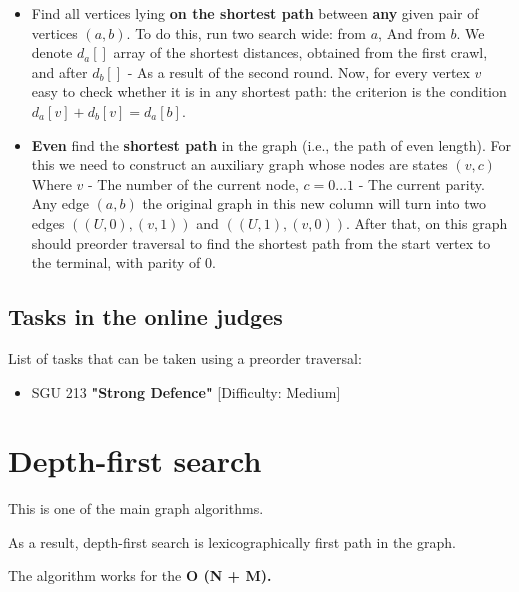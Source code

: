 \begin{itemize}
\item Find all vertices lying \textbf{on the shortest path} between \textbf{any} given pair of vertices $(a, b)$. To do this, run two search wide: from $a$, And from $b$. We denote $d_a []$ array of the shortest distances, obtained from the first crawl, and after $d_b []$ - As a result of the second round. Now, for every vertex $v$ easy to check whether it is in any shortest path: the criterion is the condition $d_a [v] + d_b [v] = d_a [b]$.

\item \textbf{Even} find the \textbf{shortest path} in the graph (i.e., the path of even length). For this we need to construct an auxiliary graph whose nodes are states $(v, c)$ Where $v$ - The number of the current node, $c = 0 \ldots 1$ - The current parity. Any edge $(a, b)$ the original graph in this new column will turn into two edges $((U, 0), (v, 1))$ and $((U, 1), (v, 0))$. After that, on this graph should preorder traversal to find the shortest path from the start vertex to the terminal, with parity of 0.

\end{itemize}

\subsection{ Tasks in the online judges }

List of tasks that can be taken using a preorder traversal:

\begin{itemize}

\item SGU 213 \textbf{"Strong Defence"} [Difficulty: Medium]

\end{itemize}

\section{ Depth-first search }
This is one of the main graph algorithms.

As a result, depth-first search is lexicographically first path in the graph.

The algorithm works for the \textbf{O (N + M).}

